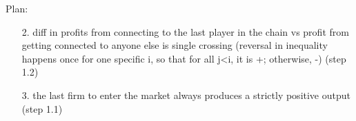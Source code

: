 \documentclass[11pt]{article}
\begin{document}
Plan: 

\begin{itemize}

\item[2.] diff in profits from connecting to the last player in the chain vs profit from getting connected to anyone else is single crossing (reversal in inequality happens once for one specific i, so that for all j<i, it is +; otherwise, -) (step 1.2)
\item[3.] the last firm to enter the market always produces a strictly positive output (step 1.1)
\end{itemize}

\indent 
\end{document}
